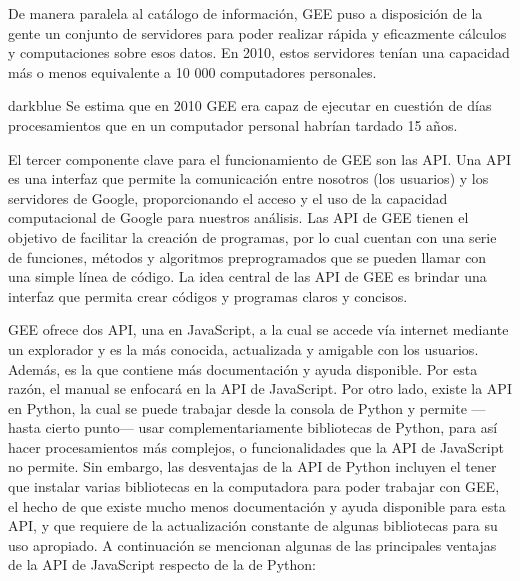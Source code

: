 \documentclass[
  12pt,
  letterpaper,
  twoside]{book}
\begin{document}
De manera paralela al catálogo de información, GEE puso a disposición de la gente un conjunto de servidores para poder realizar rápida y eficazmente cálculos y computaciones sobre esos datos. En 2010, estos servidores tenían una capacidad más o menos equivalente a 10 000 computadores personales.

\begin{bluebox2}

\begin{awesomeblock}{5pt}{\faLightbulb}{darkblue}
Se estima que en 2010 GEE era capaz de ejecutar en cuestión de días procesamientos que en un computador personal habrían tardado 15 años.

\end{awesomeblock}

\end{bluebox2}

El tercer componente clave para el funcionamiento de GEE son las API. Una API es una interfaz que permite la comunicación entre nosotros (los usuarios) y los servidores de Google, proporcionando el acceso y el uso de la capacidad computacional de Google para nuestros análisis. Las API de GEE tienen el objetivo de facilitar la creación de programas, por lo cual cuentan con una serie de funciones, métodos y algoritmos preprogramados que se pueden llamar con una simple línea de código. La idea central de las API de GEE es brindar una interfaz que permita crear códigos y programas claros y concisos.

GEE ofrece dos API, una en JavaScript, a la cual se accede vía internet mediante un explorador y es la más conocida, actualizada y amigable con los usuarios. Además, es la que contiene más documentación y ayuda disponible. Por esta razón, el manual se enfocará en la API de JavaScript. Por otro lado, existe la API en Python, la cual se puede trabajar desde la consola de Python y permite ---hasta cierto punto--- usar complementariamente bibliotecas de Python, para así hacer procesamientos más complejos, o funcionalidades que la API de JavaScript no permite. Sin embargo, las desventajas de la API de Python incluyen el tener que instalar varias bibliotecas en la computadora para poder trabajar con GEE, el hecho de que existe mucho menos documentación y ayuda disponible para esta API, y que requiere de la actualización constante de algunas bibliotecas para su uso apropiado. A continuación se mencionan algunas de las principales ventajas de la API de JavaScript respecto de la de Python:
\end{document}
